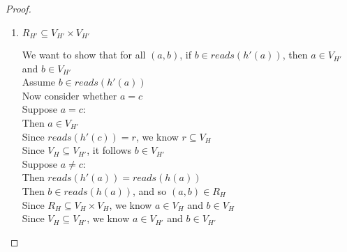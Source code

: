\begin{proof}
\begin{enumerate}
\item $R_{H'} \subseteq V_{H'} \times V_{H'}$ 
  \begin{tabbedproof}
    \oo We want to show that for all $(a,b)$, if $b \in \mathit{reads}(h'(a))$, then $a \in V_{H'}$ and $b \in V_{H'}$ \\
    \oo Assume $b \in \mathit{reads}(h'(a))$ \\
    \ooo Now consider whether $a = c$  \\
    \ooo Suppose $a = c$: \\
    \oooo Then $a \in V_{H'}$ \\
    \oooo Since $\mathit{reads}(h'(c)) = r$, we know $r \subseteq V_H$ \\
    \oooo Since $V_{H} \subseteq V_{H'}$, it follows $b \in V_{H'}$ \\
    \ooo Suppose $a \not= c$: \\
    \oooo Then $\mathit{reads}(h'(a)) = \mathit{reads}(h(a))$ \\
    \oooo Then $b \in \mathit{reads}(h(a))$, and so $(a,b) \in R_H$ \\
    \oooo Since $R_H \subseteq V_H \times V_H$, we know $a \in V_H$ and $b \in V_H$ \\
    \oooo Since $V_{H} \subseteq V_{H'}$, we know $a \in V_{H'}$ and $b \in V_{H'}$ \\
  \end{tabbedproof}


\end{enumerate}
\end{proof}
